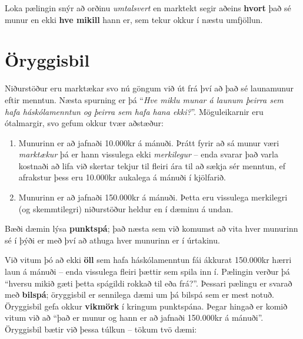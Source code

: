\documentclass[
]{book}
\providecommand{\tightlist}{%
  \setlength{\itemsep}{0pt}\setlength{\parskip}{0pt}}
\begin{document}
Loka pælingin snýr að orðinu \emph{umtalsvert} en marktekt segir aðeins \textbf{hvort} það sé munur en ekki \textbf{hve mikill} hann er, sem tekur okkur í næstu umfjöllun.

\hypertarget{uxf6ryggisbil}{%
\chapter{Öryggisbil}\label{uxf6ryggisbil}}

Niðurstöður eru marktækar svo nú göngum við út frá því að það sé launamunur eftir menntun. Næsta spurning er þá ``\emph{Hve miklu munar á launum þeirra sem hafa háskólamenntun og þeirra sem hafa hana ekki?}''. Möguleikarnir eru ótalmargir, svo gefum okkur tvær aðstæður:

\begin{enumerate}
\def\labelenumi{\arabic{enumi}.}
\tightlist
\item
  Munurinn er að jafnaði 10.000kr á mánuði. Þrátt fyrir að sá munur væri \emph{marktækur} þá er hann vissulega ekki \emph{merkilegur} -- enda svarar það varla kostnaði að lifa við skertar tekjur til fleiri ára til að sækja sér menntun, ef afrakstur þess eru 10.000kr aukalega á mánuði í kjölfarið.
\item
  Munurinn er að jafnaði 150.000kr á mánuði. Þetta eru vissulega merkilegri (og skemmtilegri) niðurstöður heldur en í dæminu á undan.
\end{enumerate}

Bæði dæmin lýsa \textbf{punktspá}; það næsta sem við komumst að vita hver munurinn sé í þýði er með því að athuga hver munurinn er í úrtakinu.

Við vitum þó að ekki \textbf{öll} sem hafa háskólamenntun fái ákkurat 150.000kr hærri laun á mánuði -- enda vissulega fleiri þættir sem spila inn í. Pælingin verður þá ``hversu mikið gæti þetta spágildi rokkað til eða frá?''. Þessari pælingu er svarað með \textbf{bilspá}; öryggisbil er sennilega dæmi um þá bilspá sem er mest notuð. Öryggisbil gefa okkur \textbf{vikmörk} í kringum punktspána. Þegar hingað er komið vitum við að ``það er munur og hann er að jafnaði 150.000kr á mánuði''. Öryggisbil bætir við þessa túlkun -- tökum tvö dæmi:
\end{document}
